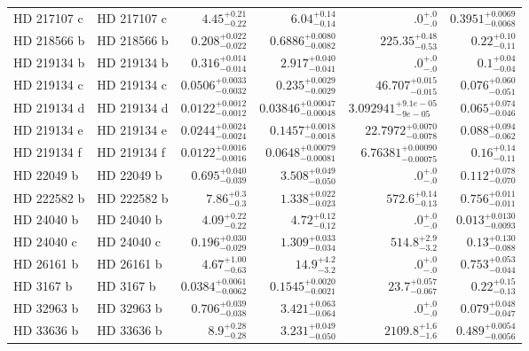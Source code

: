 \begin{longtable*}{llrrrr}
HD 217107 c & HD 217107 c & $4.45^{+0.21}_{-0.22}$ & $6.04^{+0.14}_{-0.14}$ & $.0^{+.0}_{-.0}$ & $0.3951^{+0.0069}_{-0.0068}$ \\ 
HD 218566 b & HD 218566 b & $0.208^{+0.022}_{-0.022}$ & $0.6886^{+0.0080}_{-0.0082}$ & $225.35^{+0.48}_{-0.53}$ & $0.22^{+0.10}_{-0.11}$ \\ 
HD 219134 b & HD 219134 b & $0.316^{+0.014}_{-0.014}$ & $2.917^{+0.040}_{-0.041}$ & $.0^{+.0}_{-.0}$ & $0.1^{+0.04}_{-0.04}$ \\ 
HD 219134 c & HD 219134 c & $0.0506^{+0.0033}_{-0.0032}$ & $0.235^{+0.0029}_{-0.0029}$ & $46.707^{+0.015}_{-0.015}$ & $0.076^{+0.060}_{-0.051}$ \\ 
HD 219134 d & HD 219134 d & $0.0122^{+0.0012}_{-0.0012}$ & $0.03846^{+0.00047}_{-0.00048}$ & $3.092941^{+9.1e-05}_{-9e-05}$ & $0.065^{+0.074}_{-0.046}$ \\ 
HD 219134 e & HD 219134 e & $0.0244^{+0.0024}_{-0.0024}$ & $0.1457^{+0.0018}_{-0.0018}$ & $22.7972^{+0.0070}_{-0.0078}$ & $0.088^{+0.094}_{-0.062}$ \\ 
HD 219134 f & HD 219134 f & $0.0122^{+0.0016}_{-0.0016}$ & $0.0648^{+0.00079}_{-0.00081}$ & $6.76381^{+0.00090}_{-0.00075}$ & $0.16^{+0.14}_{-0.11}$ \\ 
HD 22049 b & HD 22049 b & $0.695^{+0.040}_{-0.039}$ & $3.508^{+0.049}_{-0.050}$ & $.0^{+.0}_{-.0}$ & $0.112^{+0.078}_{-0.070}$ \\ 
HD 222582 b & HD 222582 b & $7.86^{+0.3}_{-0.3}$ & $1.338^{+0.022}_{-0.023}$ & $572.6^{+0.14}_{-0.13}$ & $0.756^{+0.011}_{-0.011}$ \\ 
HD 24040 b & HD 24040 b & $4.09^{+0.22}_{-0.22}$ & $4.72^{+0.12}_{-0.12}$ & $.0^{+.0}_{-.0}$ & $0.013^{+0.0130}_{-0.0093}$ \\ 
HD 24040 c & HD 24040 c & $0.196^{+0.030}_{-0.029}$ & $1.309^{+0.033}_{-0.034}$ & $514.8^{+2.9}_{-3.2}$ & $0.13^{+0.130}_{-0.088}$ \\ 
HD 26161 b & HD 26161 b & $4.67^{+1.00}_{-0.63}$ & $14.9^{+4.2}_{-3.2}$ & $.0^{+.0}_{-.0}$ & $0.753^{+0.053}_{-0.044}$ \\ 
HD 3167 b & HD 3167 b & $0.0384^{+0.0061}_{-0.0062}$ & $0.1545^{+0.0020}_{-0.0021}$ & $23.7^{+0.057}_{-0.067}$ & $0.22^{+0.15}_{-0.13}$ \\ 
HD 32963 b & HD 32963 b & $0.706^{+0.039}_{-0.038}$ & $3.421^{+0.063}_{-0.064}$ & $.0^{+.0}_{-.0}$ & $0.079^{+0.048}_{-0.047}$ \\ 
HD 33636 b & HD 33636 b & $8.9^{+0.28}_{-0.28}$ & $3.231^{+0.049}_{-0.050}$ & $2109.8^{+1.6}_{-1.6}$ & $0.489^{+0.0054}_{-0.0056}$ \\ 

\end{longtable*}
